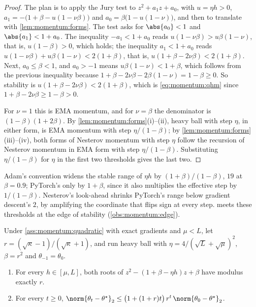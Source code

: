 \begin{refsection}
\begin{proof}
The plan is to apply the Jury test to $z^2+a_1z+a_0$, with $u=\eta h>0$, $a_1=-\bigl(1+\beta-u(1-\nu\beta)\bigr)$ and $a_0=\beta\bigl(1-u(1-\nu)\bigr)$, and then to translate with \cref{lem:momentum:forms}. The test asks for $\abs{a_0}<1$ and $\abs{a_1}<1+a_0$. The inequality $-a_1<1+a_0$ reads $u(1-\nu\beta)>u\beta(1-\nu)$, that is, $u(1-\beta)>0$, which holds; the inequality $a_1<1+a_0$ reads $u(1-\nu\beta)+u\beta(1-\nu)<2(1+\beta)$, that is, $u(1+\beta-2\nu\beta)<2(1+\beta)$. Next, $a_0\le\beta<1$, and $a_0>-1$ means $u\beta(1-\nu)<1+\beta$, which follows from the previous inequality because $1+\beta-2\nu\beta-2\beta(1-\nu)=1-\beta\ge0$. So stability is $u(1+\beta-2\nu\beta)<2(1+\beta)$, which is \eqref{eq:momentum:qhm} since $1+\beta-2\nu\beta\ge1-\beta>0$.

For $\nu=1$ this is EMA momentum, and for $\nu=\beta$ the denominator is $(1-\beta)(1+2\beta)$. By \cref{lem:momentum:forms}(i)--(ii), heavy ball with step $\eta$, in either form, is EMA momentum with step $\eta/(1-\beta)$; by \cref{lem:momentum:forms}(iii)--(iv), both forms of Nesterov momentum with step $\eta$ follow the recursion of Nesterov momentum in EMA form with step $\eta/(1-\beta)$. Substituting $\eta/(1-\beta)$ for $\eta$ in the first two thresholds gives the last two.
\end{proof}

Adam's convention widens the stable range of $\eta h$ by $(1+\beta)/(1-\beta)$, $19$ at $\beta=0.9$; PyTorch's only by $1+\beta$, since it also multiplies the effective step by $1/(1-\beta)$. Nesterov's look-ahead shrinks PyTorch's range below gradient descent's $2$, by amplifying the coordinate that flips sign at every step.  meets these thresholds at the edge of stability (\cref{obs:momentum:edge}).

\begin{theorem}\label{thm:momentum:heavyball}
Under \cref{ass:momentum:quadratic} with exact gradients and $\mu<L$, let $r=(\sqrt\kappa-1)/(\sqrt\kappa+1)$, and run heavy ball with $\eta=4/(\sqrt L+\sqrt\mu)^2$, $\beta=r^2$ and $\theta_{-1}=\theta_0$.
\begin{enumerate}
\item For every $h\in[\mu,L]$, both roots of $z^2-(1+\beta-\eta h)z+\beta$ have modulus exactly $r$.
\item For every $t\ge0$, $\norm{\theta_t-\theta^\star}_2\le\bigl(1+(1+r)t\bigr)\,r^t\,\norm{\theta_0-\theta^\star}_2$.
\end{enumerate}
\end{theorem}


\end{refsection}
